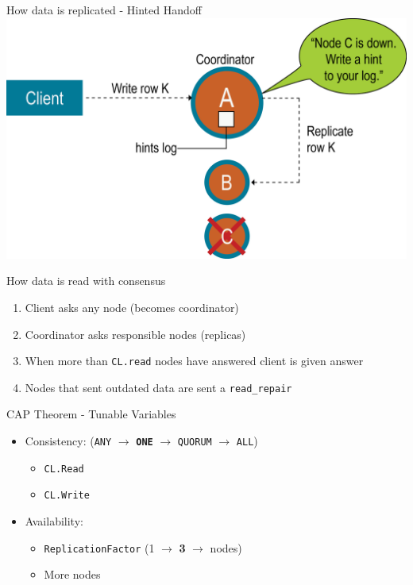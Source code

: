 \documentclass[
  10pt
]{beamer}
\begin{document}
\begin{frame}{How data is replicated - Hinted Handoff \cite{hinted_handoff}}
  \includegraphics[width=1.0\textwidth]{resources/hinted_handoff.png}
\end{frame}

\begin{frame}{How data is read with consensus}
  \begin{enumerate}
    \item<1-> Client asks any node (becomes coordinator)
    \item<2-> Coordinator asks responsible nodes (replicas)
    \item<3-> When more than \lstinline{CL.read} nodes have answered client is given answer
    \item<4-> Nodes that sent outdated data are sent a \lstinline{read_repair}
  \end{enumerate}
\end{frame}

\begin{frame}{CAP Theorem - Tunable Variables}
  \begin{itemize}
    \item<+-> Consistency: (\lstinline{ANY} $\rightarrow$ \textbf{\lstinline{ONE}} $\rightarrow$ \lstinline{QUORUM} $\rightarrow$ \lstinline{ALL})
      \begin{itemize}
        \item \lstinline{CL.Read}
        \item \lstinline{CL.Write}
      \end{itemize}
    \item<+-> Availability:
      \begin{itemize}
        \item \lstinline{ReplicationFactor} (1 $\rightarrow$ \textbf{3} $\rightarrow$ nodes)
        \item More nodes
      \end{itemize}
  \end{itemize}
\end{frame}
\end{document}
